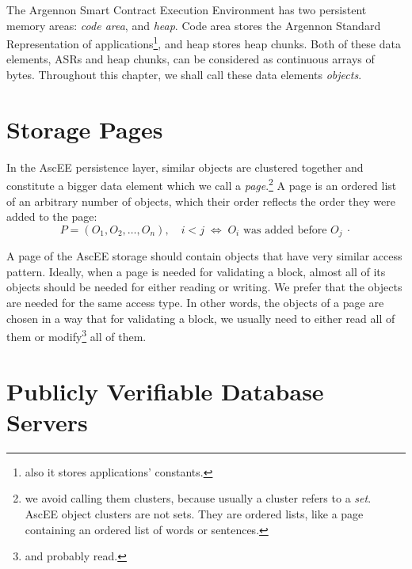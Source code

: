 
The Argennon Smart Contract Execution Environment has two persistent memory areas: \emph{code area}, and \emph{heap}.
Code area stores the Argennon Standard Representation of
applications\footnote{also it stores applications' constants.}, and heap stores heap chunks.
Both of these data elements, ASRs and heap chunks, can be considered as continuous arrays of bytes.
Throughout this chapter, we shall call these data elements \emph{objects}.


\section{Storage Pages}\label{sec:storage-pages}

In the AscEE persistence layer, similar objects are clustered together and constitute a bigger data element which we
call
a \emph{page}.\footnote{we avoid calling them clusters, because usually a cluster refers to a \emph{set}. AscEE object
clusters are not sets. They are ordered lists, like a page containing an ordered list of words or sentences.}
A page is an ordered list of an arbitrary number of objects, which their order reflects the order they were added to
the page:
\[
    P = (O_1,O_2,\dots,O_n),\quad i < j \; \Leftrightarrow \; \textrm{$O_i$ was added before $O_j$}\ \cdot
\]

A page of the AscEE storage should contain objects that have very similar access pattern. Ideally, when a page is needed
for validating a block, almost all of its objects should be needed for either reading or writing. We prefer
that the objects are needed for the same access type. In other words, the objects of a page are chosen in a way that
for validating a block, we usually need to either read all of them or modify\footnote{and probably read.} all of them.


\section{Publicly Verifiable Database Servers}\label{sec:zk-edb}


